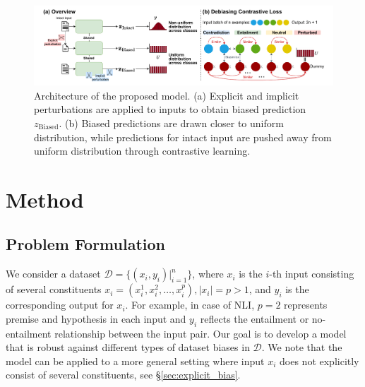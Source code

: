 \begin{figure}[t]
    \centering
    \vspace{-20pt}
    \includegraphics[width=.9\textwidth]{figure/fairflow.pdf}
    \caption{Architecture of the proposed model. (a) Explicit and implicit perturbations are applied to inputs to obtain biased prediction $z_{\mathrm{Biased}}$. (b) Biased predictions are drawn closer to uniform distribution, while predictions for intact input are pushed away from uniform distribution through contrastive learning.}
    \label{fig:model}
\end{figure}

\section{Method}
\subsection{Problem Formulation}
We consider a dataset $\mathcal{D} = \{(x_i, y_i)|_{i=1}^n\}$, where $x_i$ is the $i$-th input consisting of several constituents $x_i = (x_i^1, x_i^2, \dots, x_i^p), |x_i| = p > 1$, and $y_i$ is the corresponding output for $x_i$. For example, in case of NLI, $p=2$ represents premise and hypothesis in each input and $y_i$ reflects the entailment or no-entailment relationship between the input pair. Our goal is to develop a model that is robust against different types of dataset biases in $\mathcal{D}$. 
We note that the model can be applied to a more general setting where input $x_i$ does not explicitly consist of several constituents, see \S\ref{sec:explicit_bias}.



